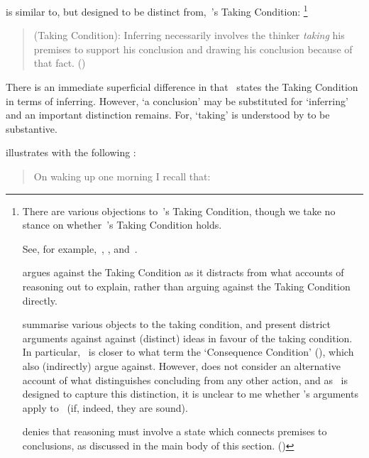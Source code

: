 \begin{note}
 \supportI{} is similar to, but designed to be distinct from,~\citeauthor{Boghossian:2014aa}'s Taking Condition:%
  \footnote{
    There are various objections to~\citeauthor{Boghossian:2014aa}'s Taking Condition, though we take no stance on whether~\citeauthor{Boghossian:2014aa}'s Taking Condition holds.

    See, for example,~\textcite{Hlobil:2014tq}, \textcite{McHugh:2016vp}, and~\textcite{Wright:2014tt}.

    \citeauthor{Hlobil:2014tq} argues against the Taking Condition as it distracts from what accounts of reasoning out to explain, rather than arguing against the Taking Condition directly.

    \citeauthor{McHugh:2016vp} summarise various objects to the taking condition, and present district arguments against against (distinct) ideas in favour of the taking condition.
    In particular,~\supportI{} is closer to what \citeauthor{McHugh:2016vp} term the `Consequence Condition' (\citeyear[cf.][316]{McHugh:2016vp}), which \citeauthor{McHugh:2016vp} also (indirectly) argue against.
    However, \citeauthor{McHugh:2016vp} does not consider an alternative account of what distinguishes concluding from any other action, and as~\supportI{} is designed to capture this distinction, it is unclear to me whether \citeauthor{McHugh:2016vp}'s arguments apply to~\supportI{} (if, indeed, they are sound).

    \citeauthor{Wright:2014tt} denies that reasoning must involve a state which connects premises to conclusions, as discussed in the main body of this section. (\citeyear[Cf.][33-34]{Wright:2014tt})
  }

  \begin{quote}
    (Taking Condition):
    Inferring necessarily involves the thinker \emph{taking} his premises to support his conclusion and drawing his conclusion because of that fact.%
    \mbox{}\hfill\mbox{(\citeyear[5]{Boghossian:2014aa})}
  \end{quote}

  There is an immediate superficial difference in that~\citeauthor{Boghossian:2014aa} states the Taking Condition in terms of inferring.
  However, `a conclusion' may be substituted for `inferring' and an important distinction remains.
  For, `taking' is understood by \citeauthor{Boghossian:2014aa} to be substantive.

  \citeauthor{Boghossian:2014aa} illustrates with the following \scen{}:
  \begin{quote}
    On waking up one morning I recall that:


\end{quote}
\end{note}
